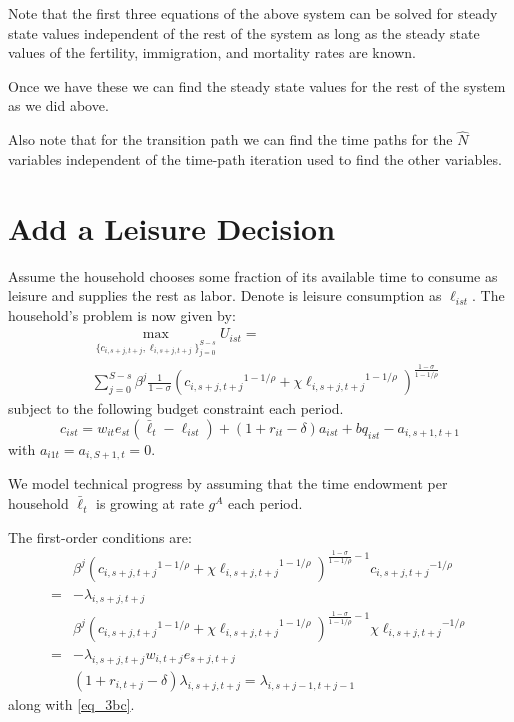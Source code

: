 \documentclass[letterpaper,12pt]{article}
\theoremstyle{definition}
\numberwithin{equation}{section}
\begin{document}
\begin{spacing}{1.5}
	Note that the first three equations of the above system can be solved for steady state values independent of the rest of the system as long as the steady state values of the fertility, immigration, and mortality rates are known.

	Once we have these we can find the steady state values for the rest of the system as we did above.

	Also note that for the transition path we can find the time paths for the $\hat N$ variables independent of the time-path iteration used to find the other variables.


\newpage
\section{Add a Leisure Decision}
	Assume the household chooses some fraction of its available time to consume as leisure and supplies the rest as labor.  Denote is leisure consumption as $\ell_{ist}$.  The household's problem is now given by:
	\begin{equation}
		\begin{split}
		& \max_{\{c_{i,s+j,t+j},\ell_{i,s+j,t+j}\}_{j=0}^{S-s}} U_{ist} = \\
		& \sum_{j=0}^{S-s} \beta^j \frac{1}{1-\sigma} \left( {c_{i,s+j,t+j}}^{1-1/\rho} + \chi {\ell_{i,s+j,t+j}}^{1-1/\rho}\right)^{\tfrac{{1-\sigma}}{1-1/\rho}}  \nonumber
		\end{split}
	\end{equation}
	subject to the following budget constraint each period.
	\begin{equation} \label{eq_3bc}
		c_{ist} = w_{it} e_{st} (\bar \ell_t -\ell_{ist}) + (1+r_{it}-\delta)a_{ist} + bq_{ist} - a_{i,s+1,t+1}
	\end{equation}
	with $a_{i1t} = a_{i,S+1,t} = 0$.

	We model technical progress by assuming that the time endowment per household $\bar \ell_t$ is growing at rate $g^A$ each period.

	The first-order conditions are:
	\begin{align}
		& \beta^j \left( {c_{i,s+j,t+j}}^{1-1/\rho} + \chi {\ell_{i,s+j,t+j}}^{1-1/\rho}\right)^{\tfrac{{1-\sigma}}{1-1/\rho}-1} {c_{i,s+j,t+j}}^{-1/\rho}  \nonumber \\ = &  - \lambda_{i,s+j,t+j}  \label{eq_3foc1} \\
		& \beta^j \left( {c_{i,s+j,t+j}}^{1-1/\rho} + \chi {\ell_{i,s+j,t+j}}^{1-1/\rho}\right)^{\tfrac{{1-\sigma}}{1-1/\rho}-1} \chi {\ell_{i,s+j,t+j}}^{-1/\rho} \nonumber \\ = & - \lambda_{i,s+j,t+j} w_{i,t+j} e_{s+j,t+j} \label{eq_3foc2} \\
        & (1+r_{i,t+j}-\delta) \lambda_{i,s+j,t+j} = \lambda_{i,s+j-1,t+j-1} \label{eq_3foc3}
	\end{align}	
	along with \eqref{eq_3bc}.


\end{spacing}
\end{document}
